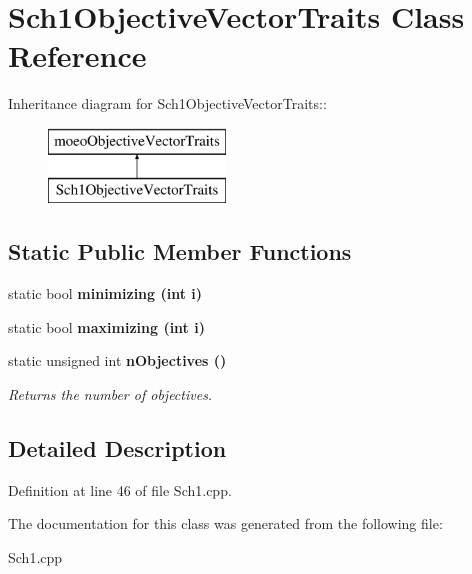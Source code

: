 \section{Sch1Objective\-Vector\-Traits Class Reference}
\label{classSch1ObjectiveVectorTraits}
Inheritance diagram for Sch1Objective\-Vector\-Traits::\begin{figure}[H]
\begin{center}
\leavevmode
\includegraphics[height=2cm]{classSch1ObjectiveVectorTraits}
\end{center}
\end{figure}
\subsection*{Static Public Member Functions}
\begin{CompactItemize}
\item 
static bool \bf{minimizing} (int i)\label{classSch1ObjectiveVectorTraits_455ac35e419ad21c0a4ba4bbd2768ca5}

\item 
static bool \bf{maximizing} (int i)\label{classSch1ObjectiveVectorTraits_a7de212f3346dde550757e8a412baa4d}

\item 
static unsigned int \bf{n\-Objectives} ()\label{classSch1ObjectiveVectorTraits_54ae04aa8eb052223778ecae175be95b}

\begin{CompactList}\small\item\em Returns the number of objectives. \item\end{CompactList}\end{CompactItemize}


\subsection{Detailed Description}




Definition at line 46 of file Sch1.cpp.

The documentation for this class was generated from the following file:\begin{CompactItemize}
\item 
Sch1.cpp\end{CompactItemize}
